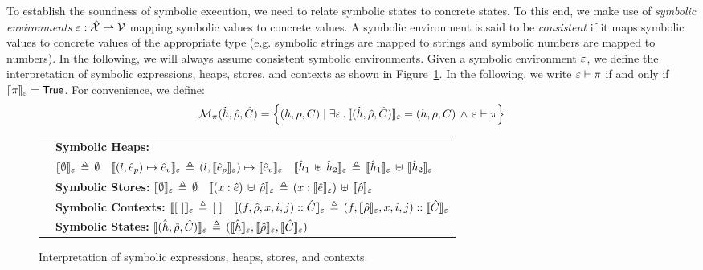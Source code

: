  To establish the soundness of symbolic execution, we need to relate 
symbolic states to concrete states. To this end, we make use of \emph{symbolic environments} 
$\varepsilon : \hat{\mathcal{X}} \rightharpoonup \mathcal{V}$ mapping symbolic values to concrete values. 
A symbolic environment is said to be \emph{consistent} if it maps symbolic 
values to concrete values of the appropriate type (e.g. symbolic strings are mapped to strings 
and symbolic numbers are mapped to numbers). In the following, we will always 
assume consistent symbolic environments. 
%
Given a symbolic environment $\varepsilon$, we define the interpretation of symbolic 
expressions, heaps, stores, and contexts as shown in Figure~\ref{fig:symbolic:interp}. 
In the following, we write $\varepsilon \vdash \pi$  if and only if $\llbracket \pi \rrbracket_{\varepsilon} = \mathsf{True}$. For convenience, we define: 
\begin{equation}
\mathcal{M}_{\pi}(\hat{h}, \hat\rho, \hat{C}) = \left\{ (h, \rho, C) \mid \exists \varepsilon \, . \,  \llbracket (\hat{h}, \hat\rho, \hat{C}) \rrbracket_{\varepsilon} = (h, \rho, C) \, \wedge \,  \varepsilon \vdash \pi  \right\} 
\end{equation}

\begin{figure}[ht!]
{
\begin{tabular}{l}
$\quad${\bf Symbolic Heaps:}  \\
$
\quad
 \llbracket \emptyset \rrbracket_{\varepsilon} \,\triangleq\, \emptyset
\quad
\llbracket (l, \hat{e}_p) \mapsto \hat{e}_v \rrbracket_{\varepsilon} \,\triangleq\,  (l, \llbracket \hat{e}_p \rrbracket_{\varepsilon}) \mapsto \llbracket \hat{e}_v \rrbracket_{\varepsilon}
\quad
\llbracket \hat{h}_1 \, \uplus \, \hat{h}_2 \rrbracket_{\varepsilon} \,\triangleq\,  \llbracket \hat{h}_1 \rrbracket_{\varepsilon} \, \uplus \, \llbracket \hat{h}_2 \rrbracket_{\varepsilon}
$%
\\[3pt]
$\quad${\bf Symbolic Stores:}  
$
 \llbracket \emptyset \rrbracket_{\varepsilon} \,\triangleq\, \emptyset
\quad 
 \llbracket (x: \hat{e}) \, \uplus \, \hat\rho \rrbracket_{\varepsilon} \,\triangleq\, (x: \llbracket \hat{e} \rrbracket_{\varepsilon}) \, \uplus \, \llbracket \hat\rho \rrbracket_{\varepsilon}
$%
\\[3pt]
$\quad${\bf Symbolic Contexts:}  
$ \llbracket [ \ ] \rrbracket_{\varepsilon} \,\triangleq\, [ \ ]
\quad 
 \llbracket (f, \hat\rho, x, i, j) :: \hat{C} \rrbracket_{\varepsilon} \,\triangleq\, (f, \llbracket \hat\rho \rrbracket_{\varepsilon}, x, i, j) :: \llbracket \hat{C} \rrbracket_{\varepsilon}
$%

\\[3pt]
$\quad${\bf Symbolic States:}  $\llbracket (\hat{h}, \hat\rho, \hat{C}) \rrbracket_{\varepsilon} \,\triangleq\, (\llbracket \hat{h} \rrbracket_{\varepsilon}, \llbracket \hat\rho \rrbracket_{\varepsilon}, \llbracket \hat{C} \rrbracket_{\varepsilon})$
\end{tabular}
}
\caption{Interpretation of symbolic expressions, heaps, stores, and contexts.\label{fig:symbolic:interp}}
\end{figure}


